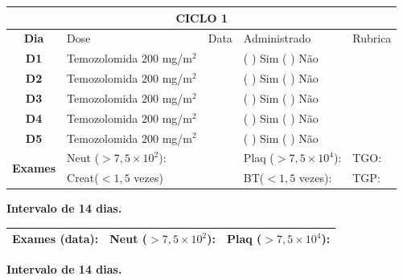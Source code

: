 \documentclass[11pt,a4paper,oldfontcommands]{memoir}
\begin{document}
\begin{center}
\begin{longtable}{p{1cm}p{4cm}|p{1cm}|p{4.6cm}|p{3cm}}
	\hline
	\multicolumn{5}{c}{\textbf{CICLO 1}}\\
\hline
    \multicolumn{1}{c|}{\multirow{1}{*}{\textbf{Dia}}}&{Dose}&{Data}&{Administrado}&{Rubrica} \\
    \hline
    \multicolumn{1}{c|}{\multirow{1}{*}{\textbf{D1}}}&{Temozolomida \(200\) mg/m\(^2\)}&&{(  ) Sim (  ) Não}&\\
    \multicolumn{1}{c|}{\multirow{1}{*}{\textbf{D2}}}&{Temozolomida \(200\) mg/m\(^2\)}&&{(  ) Sim (  ) Não}&\\
    \multicolumn{1}{c|}{\multirow{1}{*}{\textbf{D3}}}&{Temozolomida \(200\) mg/m\(^2\)}&&{(  ) Sim (  ) Não}&\\
    \multicolumn{1}{c|}{\multirow{1}{*}{\textbf{D4}}}&{Temozolomida \(200\) mg/m\(^2\)}&&{(  ) Sim (  ) Não}&\\
    \multicolumn{1}{c|}{\multirow{1}{*}{\textbf{D5}}}&{Temozolomida \(200\) mg/m\(^2\)}&&{(  ) Sim (  ) Não}&\\
    \hline
    \multicolumn{1}{c|}{\multirow{2}{*}{\textbf{Exames}}}&\multicolumn{2}{l|}{Neut (\(>7,5\times10^2\)):}&{Plaq (\(>7,5\times10^4\)):}&{TGO:}\\
    \cline{2-5}
    \multicolumn{1}{c|}{\multirow{2}{*}{{}}}&\multicolumn{2}{l|}{Creat(\(<1,5\) vezes)}&{BT(\(<1,5\) vezes):}&{TGP:}
    \\
    \hline
\end{longtable}
\textbf{Intervalo de 14 dias.}
\begin{longtable}{p{5cm}|p{5cm}|p{4.5cm}}
    \hline
    \textbf{Exames (data):}&{Neut (\(>7,5\times10^2\)):}&{Plaq (\(>7,5\times10^4\)):}
    \\
    \hline
\end{longtable}
\textbf{Intervalo de 14 dias.}
\\[1.5cm]
\end{center}
\end{document}
